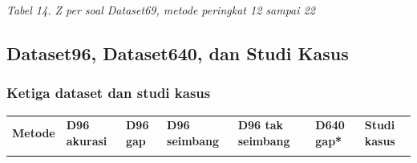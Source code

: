 \documentclass[10pt,a4paper]{article}
\newcounter{none}
\begin{document}
\emph{Tabel 14. Z per soal Dataset69, metode peringkat 12 sampai 22}

\subsection{Dataset96, Dataset640, dan Studi
Kasus}\label{hasil-pada-dataset96-dataset640-dan-studi-kasus}

\subsubsection{Ketiga dataset dan studi
kasus}\label{ketiga-dataset-dan-studi-kasus}

{\def\LTcaptype{none} %
\begin{longtable}[]{@{}
  >{\raggedright\arraybackslash}p{}
  >{\raggedright\arraybackslash}p{}
  >{\raggedright\arraybackslash}p{}
  >{\raggedright\arraybackslash}p{}
  >{\raggedright\arraybackslash}p{}
  >{\raggedright\arraybackslash}p{}
  >{\raggedright\arraybackslash}p{}@{}}
\toprule\noalign{}
\begin{minipage}[b]{\linewidth}\raggedright
\textbf{Metode}
\end{minipage} & \begin{minipage}[b]{\linewidth}\centering
\textbf{D96 akurasi}
\end{minipage} & \begin{minipage}[b]{\linewidth}\centering
\textbf{D96 gap}
\end{minipage} & \begin{minipage}[b]{\linewidth}\centering
\textbf{D96 seimbang}
\end{minipage} & \begin{minipage}[b]{\linewidth}\centering
\textbf{D96 tak seimbang}
\end{minipage} & \begin{minipage}[b]{\linewidth}\centering
\textbf{D640 gap*}
\end{minipage} & \begin{minipage}[b]{\linewidth}\centering
\textbf{Studi kasus}
\end{minipage} \\
\begin{minipage}[b]{\linewidth}\raggedright

\end{minipage}
\end{longtable}}
\end{document}
